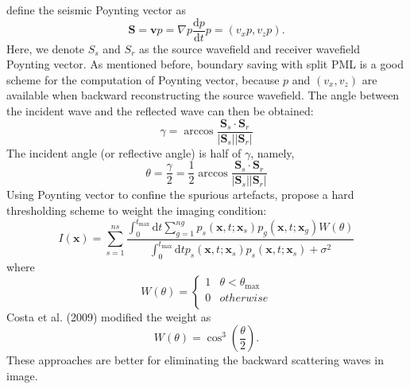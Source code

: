 \cite{yoon20033d} define the seismic Poynting vector as
\begin{equation}
\textbf{S}=\textbf{v}p=\nabla p \frac{\mathrm{d}p}{\mathrm{d}t}p=(v_xp, v_zp).
\end{equation}
Here, we denote $S_s$ and $S_r$ as the source wavefield and receiver wavefield Poynting vector. As mentioned before, boundary saving with split PML  is a good scheme for the computation of Poynting vector, because $p$ and $(v_x,v_z)$ are available when backward reconstructing the source wavefield. The angle between the incident wave and the reflected wave can then be obtained:
\begin{equation}
\gamma=\arccos\frac{\textbf{S}_s\cdot \textbf{S}_r}{|\textbf{S}_s||\textbf{S}_r|}
\end{equation}
The incident angle (or reflective angle) is half of $\gamma$, namely,
\begin{equation}
\theta=\frac{\gamma}{2}=\frac{1}{2}\arccos\frac{\textbf{S}_s\cdot \textbf{S}_r}{|\textbf{S}_s||\textbf{S}_r|}
\end{equation}
Using Poynting vector to confine the spurious artefacts, \cite{yoon2006reverse} propose a hard thresholding scheme to weight the imaging condition:
\begin{equation}
I(\textbf{x})=\sum_{s=1}^{ns}\frac{\int_{0}^{t_{\max}}\mathrm{d}t \sum_{g=1}^{ng}p_s(\textbf{x},t;\textbf{x}_s)p_g(\textbf{x},t;\textbf{x}_g)W(\theta)}{\int_{0}^{t_{\max}}\mathrm{d}t p_s(\textbf{x},t;\textbf{x}_s)p_s(\textbf{x},t;\textbf{x}_s)+\sigma^2}
\end{equation}
where
\begin{equation}
W(\theta)=\begin{cases}
1 & \theta<\theta_{\max}\\
0 & otherwise\\
\end{cases}
\end{equation}
Costa et al. (2009) modified the weight as
\begin{equation}
W(\theta)=\cos^3(\frac{\theta}{2}).
\end{equation}
These approaches are better for eliminating the backward scattering waves in image. 

